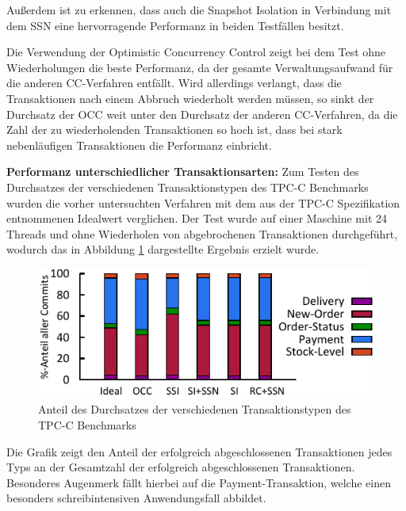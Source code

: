 Außerdem ist zu erkennen, dass auch die Snapshot Isolation in Verbindung mit dem SSN eine hervorragende Performanz in beiden Testfällen besitzt.

Die Verwendung der Optimistic Concurrency Control zeigt bei dem Test ohne Wiederholungen die beste Performanz, da der gesamte Verwaltungsaufwand für die anderen CC-Verfahren entfällt.
Wird allerdings verlangt, dass die Transaktionen nach einem Abbruch wiederholt werden müssen, so sinkt der Durchsatz der OCC weit unter den Durchsatz der anderen CC-Verfahren, da die Zahl der zu wiederholenden Transaktionen so hoch ist, dass bei stark nebenläufigen Transaktionen die Performanz einbricht.

\textbf{Performanz unterschiedlicher Transaktionsarten:} Zum Testen des Durchsatzes der verschiedenen Transaktionstypen des TPC-C Benchmarks wurden die vorher untersuchten Verfahren mit dem aus der TPC-C Spezifikation entnommenen Idealwert verglichen.
Der Test wurde auf einer Maschine mit 24 Threads und ohne Wiederholen von abgebrochenen Transaktionen durchgeführt, wodurch das in Abbildung \ref{fig:breakdown} dargestellte Ergebnis erzielt wurde.

\begin{figure}
	\includegraphics[width=\columnwidth]{img/Figure_4.pdf}
	\caption{Anteil des Durchsatzes der verschiedenen Transaktionstypen des TPC-C Benchmarks}
	\label{fig:breakdown}
\end{figure}

Die Grafik zeigt den Anteil der erfolgreich abgeschlossenen Transaktionen jedes Typs an der Gesamtzahl der erfolgreich abgeschlossenen Transaktionen.
Besonderes Augenmerk fällt hierbei auf die Payment-Transaktion, welche einen besonders schreibintensiven Anwendungsfall abbildet.

